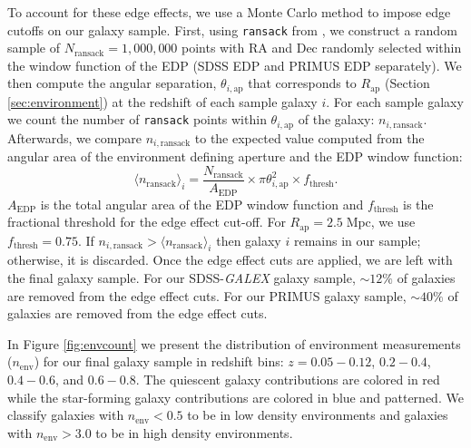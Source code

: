 \documentclass{aastex}
\def \apradius{2.5}
\begin{document}
To account for these edge effects, we use a Monte Carlo method to impose edge cutoffs on our galaxy sample. First, using \texttt{ransack} from \cite{Swanson:2008aa}, we construct a random sample of  $N_{\mathrm{ransack}} = 1,000,000$ points with RA and Dec randomly selected within the window function of the EDP (SDSS EDP and PRIMUS EDP separately). We then compute the angular separation, $\theta_{i, \mathrm{ap}}$ that corresponds to $R_{\mathrm{ap}}$ (Section \ref{sec:environment}) at the redshift of each sample galaxy $i$. For each sample galaxy we count the number of \texttt{ransack} points within $\theta_{i, \mathrm{ap}}$ of the galaxy: $n_{i,\mathrm{ransack}}$. Afterwards, we compare $n_{i,\mathrm{ransack}}$ to the expected value computed from the angular area of the environment defining aperture and the EDP window function: 
\begin{equation} \label{eq:ransack}
\langle n_{\mathrm{ransack}}\rangle_{i} = \frac{N_{\mathrm{ransack}}}{A_{\mathrm{EDP}}}\times {\pi \theta_{i, \mathrm{ap}}^2} \times f_{\mathrm{thresh}}. 
\end{equation} 
$A_{\mathrm{EDP}}$ is the total angular area of the EDP window function and $f_{\mathrm{thresh}}$ is the fractional threshold for the edge effect cut-off. For $R_{\mathrm{ap}}= \apradius \;\mathrm{Mpc}$, we use $f_{\mathrm{thresh}} = 0.75$. If $n_{i, \mathrm{ransack}} > \langle n_{\mathrm{ransack}} \rangle_i$ then galaxy $i$ remains in our sample; otherwise, it is discarded. Once the edge effect cuts are applied, we are left with the final galaxy sample. For our SDSS-{\em GALEX} galaxy sample, $\sim 12 \%$ of galaxies are removed from the edge effect cuts. For our PRIMUS galaxy sample, $\sim 40 \%$ of galaxies are removed from the edge effect cuts. 

In Figure \ref{fig:envcount} we present the distribution of environment measurements ($n_{\mathrm{env}}$) for our final galaxy sample in redshift bins: $z = 0.05 - 0.12$, $0.2 - 0.4$, $0.4-0.6$, and $0.6-0.8$. The quiescent galaxy contributions are colored in red while the star-forming galaxy contributions are colored in blue and patterned. We classify galaxies with $n_{\mathrm{env}} < 0.5$ to be in low density environments and galaxies with $n_{\mathrm{env}} > 3.0$ to be in high density environments. 
\end{document}

